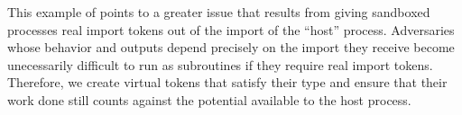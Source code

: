 This example of \Fdb points to a greater issue that results from giving sandboxed processes
real import tokens out of the import of the ``host'' process. Adversaries whose behavior and outputs
depend precisely on the import they receive become unecessarily difficult to run as subroutines 
if they require real import tokens. Therefore, we create virtual tokens 
that satisfy their type and ensure that their work done still counts against the potential
available to the host process.



